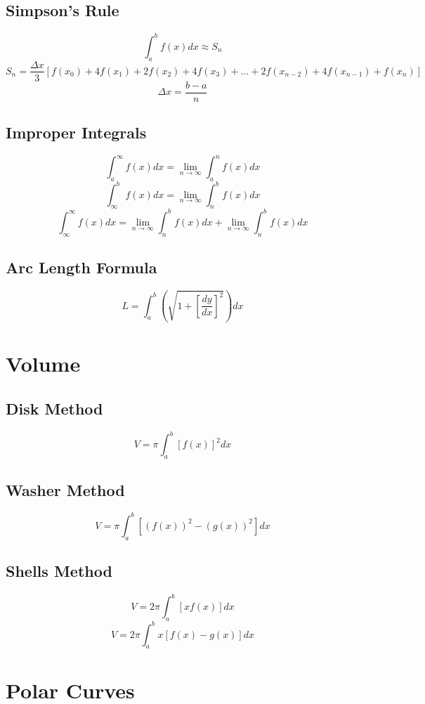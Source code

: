 \documentclass[12pt]{article}
\begin{document}
\subsection{Simpson's Rule}
\[
	\int_a^b f(x) dx \approx S_n
\]
\[
	S_n = \frac{\Delta x}{3} \left [ f(x_0) + 4f(x_1) + 2f(x_2) + 4f(x_3) + ... + 2f(x_{n-2}) + 4f(x_{n-1}) + f(x_n) \right ]
\]
\[
	\Delta x = \frac{b - a}{n}
\]

\subsection{Improper Integrals}
\[
	\int_a^\infty f(x) dx = \lim_{n\rightarrow \infty} \int_a^n f(x) dx
\]
\[
	\int_\infty^b f(x) dx = \lim_{n\rightarrow \infty} \int_n^b f(x) dx
\]
\[
	\int_\infty^\infty f(x) dx = \lim_{n\rightarrow \infty} \int_n^b f(x) dx +  \lim_{n\rightarrow \infty} \int_n^b f(x) dx
\]


\subsection{Arc Length Formula}
\[
	L = \int_a^b \left ( \sqrt{1 + \left [ \frac{dy}{dx} \right ]^{2} } \right ) dx
\]



\section*{Volume}

\subsection{Disk Method}
\[
	V = \pi \int_a^b \left [ f(x) \right ] ^{2} dx
\]

\subsection{Washer Method}
\[
	V = \pi \int_a^b \left [ \left ( f(x) \right ) ^{2} - \left ( g(x) \right )^{2} \right ] dx
\]

\subsection{Shells Method}
\[
	V = 2 \pi \int_a^b \left [ x  f(x) \right ] dx
\]
\[
	V = 2 \pi \int_a^b  x  \left [ f(x) - g(x) \right ] dx
\]\pagebreak

\section{Polar Curves}
\end{document}
